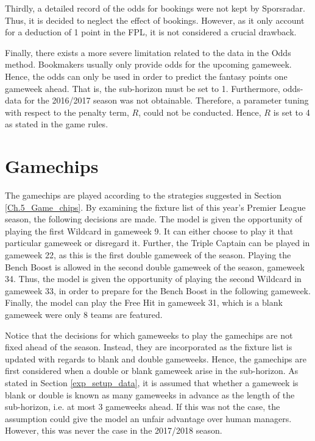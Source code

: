 \newpar

Thirdly, a detailed record of the odds for bookings were not kept by Sporsradar. Thus, it is decided to neglect the effect of bookings. However, as it only account for a deduction of 1 point in the FPL, it is not considered a crucial drawback.

\newpar

Finally, there exists a more severe limitation related to the data in the Odds method. Bookmakers usually only provide odds for the upcoming gameweek. Hence, the odds can only be used in order to predict the fantasy points one gameweek ahead. That is, the sub-horizon must be set to 1. Furthermore, odds-data for the 2016/2017 season was not obtainable. Therefore, a parameter tuning with respect to the penalty term, $R$, could not be conducted. Hence, $R$ is set to 4 as stated in the game rules. 

\newpar



\section{Gamechips} \label{exp_setup_gamechips}

The gamechips are played according to the strategies suggested in Section \ref{Ch.5_Game_chips}. By examining the fixture list of this year's Premier League season, the following decisions are made. The model is given the opportunity of playing the first Wildcard in gameweek 9. It can either choose to play it that particular gameweek or disregard it. Further, the Triple Captain can be played in gameweek 22, as this is the first double gameweek of the season. Playing the Bench Boost is allowed in the second double gameweek of the season, gameweek 34. Thus, the model is given the opportunity of playing the second Wildcard in gameweek 33, in order to prepare for the Bench Boost in the following gameweek. Finally, the model can play the Free Hit in gameweek 31, which is a blank gameweek were only 8 teams are featured. 

\newpar

Notice that the decisions for which gameweeks to play the gamechips are not fixed ahead of the season. Instead, they are incorporated as the fixture list is updated with regards to blank and double gameweeks. Hence, the gamechips are first considered when a double or blank gameweek arise in the sub-horizon. As stated in Section \ref{exp_setup_data}, it is assumed that whether a gameweek is blank or double is known as many gameweeks in advance as the length of the sub-horizon, i.e. at most 3 gameweeks ahead. If this was not the case, the assumption could give the model an unfair advantage over human managers. However, this was never the case in the 2017/2018 season.


